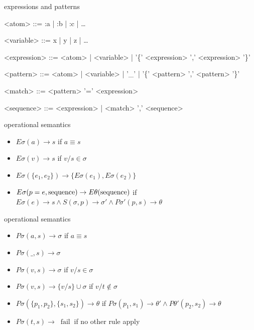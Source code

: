 \begin{frame}{expressions and patterns}

\begin{grammar}
<atom> ::= :a | :b | :c | \ldots

<variable> ::= x | y | z | \ldots

<expression> ::= <atom> | <variable> | '\{' <expression> ',' <expression> '\}'

<pattern> ::= <atom> | <variable> | '\_' | '\{' <pattern> ',' <pattern> '\}'

<match> ::=  <pattern> '=' <expression>

<sequence> ::=  <expression> | <match> ',' <sequence>
\end{grammar}
\end{frame}

\begin{frame}{operational semantics}

 \begin{itemize}
   \pause \item $E\sigma(a) \rightarrow s$ if $a \equiv s$ 
   \pause \item $E\sigma(v) \rightarrow s$ if $v/s \in \sigma$
   \pause \item $E\sigma(\lbrace e_1 , e_2\rbrace) \rightarrow \lbrace E\sigma(e_1), E\sigma(e_2) \rbrace$
 \end{itemize}

\begin{itemize}
  \pause \item $E\sigma(p = e, {\rm sequence}) \rightarrow E\theta({\rm sequence})$ if  $E\sigma(e) \rightarrow s \wedge S(\sigma, p) \rightarrow \sigma' \wedge P\sigma'(p, s) \rightarrow \theta$
\end{itemize}

\end{frame}

\begin{frame}{operational semantics}

\pause
\begin{itemize}
  \pause \item $P\sigma(a, s) \rightarrow \sigma$  if  $a \equiv s$
  \pause \item $P\sigma(\_, s) \rightarrow \sigma$  
  \pause \item $P\sigma(v,s) \rightarrow \sigma$  if \pause $ v/s \in \sigma $
  \pause \item $P\sigma(v,s) \rightarrow \lbrace v/s \rbrace \cup \sigma$ if \pause $ v/t \not\in \sigma$
  \pause \item $P\sigma(\lbrace p_1, p_2 \rbrace , \lbrace s_1, s_2 \rbrace) \rightarrow \theta$ if
      $P\sigma(p_1,s_1) \rightarrow \theta' \wedge P\theta'(p_2,s_2) \rightarrow \theta$
\end{itemize}
\pause
\begin{itemize}
  \pause \item $P\sigma(t,s) \rightarrow$ \pause $\  \mathrm{fail}\ $ if no other rule apply
\end{itemize}

\end{frame}


